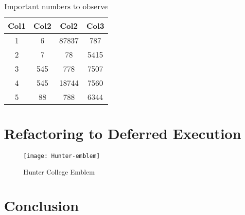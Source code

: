 \documentclass[
bibfile=references
]{hunterthesis}
\begin{document}
\lipsum[10-15]

\begin{table}[h!]
	\centering
    \label{Tab:Numbers}
    \caption{Important numbers to observe}
	\begin{tabular}{||c c c c||} 
		\hline
		Col1 & Col2 & Col2 & Col3 \\ [0.5ex] 
		\hline\hline
		1 & 6 & 87837 & 787 \\ 
		2 & 7 & 78 & 5415 \\
		3 & 545 & 778 & 7507 \\
		4 & 545 & 18744 & 7560 \\
		5 & 88 & 788 & 6344 \\ [1ex] 
		\hline
	\end{tabular}
\end{table}

\lipsum[20]


\chapter{Refactoring to Deferred Execution}

\lipsum[21]

\begin{figure}[h!]
	\centering
    \caption{Hunter College Emblem}
    \label{Fig:Emblem}
    \texttt{[image: Hunter-emblem]}
\end{figure}

\lipsum[22-40]


\chapter{Conclusion}

\lipsum[41-50]


\ThesisBackmatter
\end{document}
